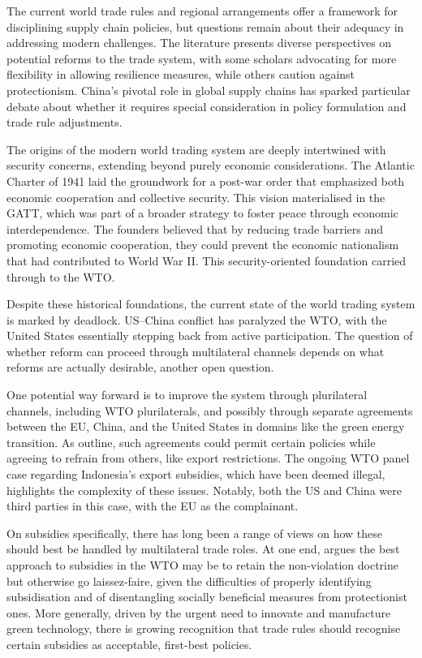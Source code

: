 \documentclass{article}
\begin{document}
The current world trade rules and regional arrangements offer a framework for disciplining supply chain policies, but questions remain about their adequacy in addressing modern challenges. The literature presents diverse perspectives on potential reforms to the trade system, with some scholars advocating for more flexibility in allowing resilience measures, while others caution against protectionism. China's pivotal role in global supply chains has sparked particular debate about whether it requires special consideration in policy formulation and trade rule adjustments.

The origins of the modern world trading system are deeply intertwined with security concerns, extending beyond purely economic considerations. The Atlantic Charter of 1941 laid the groundwork for a post-war order that emphasized both economic cooperation and collective security. This vision materialised in the GATT, which was part of a broader strategy to foster peace through economic interdependence. The founders believed that by reducing trade barriers and promoting economic cooperation, they could prevent the economic nationalism that had contributed to World War II. This security-oriented foundation carried through to the WTO.

Despite these historical foundations, the current state of the world trading system is marked by deadlock. US--China conflict has paralyzed the WTO, with the United States essentially stepping back from active participation. The question of whether reform can proceed through multilateral channels depends on what reforms are actually desirable, another open question. 

One potential way forward is to improve the system through plurilateral channels, including WTO plurilaterals, and possibly through separate agreements between the EU, China, and the United States in domains like the green energy transition. As \textcite{bown_how_2023} outline, such agreements could permit certain policies while agreeing to refrain from others, like export restrictions. The ongoing WTO panel case regarding Indonesia's export subsidies, which have been deemed illegal, highlights the complexity of these issues. Notably, both the US and China were third parties in this case, with the EU as the complainant.

On subsidies specifically, there has long been a range of views on how these should best be handled by multilateral trade roles. At one end, \textcite{sykes_subsidies_2005, sykes_questionable_2010} argues the best approach to subsidies in the WTO may be to retain the non-violation doctrine but otherwise go laissez-faire, given the difficulties of properly identifying subsidisation and of disentangling socially beneficial measures from protectionist ones. More generally, driven by the urgent need to innovate and manufacture green technology, there is growing recognition that trade rules should recognise certain subsidies as acceptable, first-best policies. 
\end{document}
